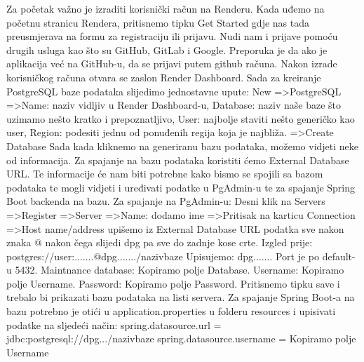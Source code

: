 			 \noindent Za početak važno je izraditi korisnički račun na Renderu. Kada uđemo na početnu stranicu Rendera, pritisnemo tipku Get Started gdje nas tada preusmjerava na formu za registraciju ili prijavu. Nudi nam i prijave pomoću drugih usluga kao što su GitHub, GitLab i Google. Preporuka je da ako je aplikacija već na GitHub-u, da se prijavi putem github računa.
			 \bigbreak
			 \noindent Nakon izrade korisničkog računa otvara se zaslon Render Dashboard. Sada za kreiranje PostgreSQL baze podataka slijedimo jednostavne upute:
			 \bigbreak
			\noindent  New =\textgreater  PostgreSQL =\textgreater  Name: naziv vidljiv u Render Dashboard-u, Database: naziv naše baze što uzimamo nešto kratko i prepoznatljivo, User: najbolje staviti nešto generičko kao user, Region: podesiti jednu od ponuđenih regija koja je najbliža. =\textgreater  Create Database
			\bigbreak
			\noindent Sada kada kliknemo na generiranu bazu podataka, možemo vidjeti neke od informacija. Za spajanje na bazu podataka koristiti ćemo External Database URL. 
			\bigbreak
			\noindent Te informacije će nam biti potrebne kako bismo se spojili sa bazom podataka te mogli vidjeti i uređivati podatke u PgAdmin-u te za spajanje Spring Boot backenda na bazu.
			\bigbreak
			\noindent Za spajanje na PgAdmin-u:
			Desni klik na Servers =\textgreater  Register =\textgreater  Server =\textgreater  Name: dodamo ime =\textgreater  Pritisak na karticu Connection =\textgreater  Host name/address upišemo iz External Database URL podatka sve nakon znaka @ nakon čega slijedi dpg pa sve do zadnje kose crte.\newline
			Izgled prije: postgres://user:.......@dpg......./nazivbaze \newline
			Upisujemo: dpg....... \newline
			Port je po default-u 5432. \newline
			Maintnance database: Kopiramo polje Database. \newline
			Username: Kopiramo polje Username. \newline
			Password: Kopiramo polje Password. \newline
			Pritisnemo tipku save i trebalo bi prikazati bazu podataka na listi servera.
			\bigbreak
			\noindent Za spajanje Spring Boot-a na bazu potrebno je otići u application.properties u folderu resources i upisivati podatke na sljedeći način:\newline
			spring.datasource.url = jdbc:postgresql://dpg.../nazivbaze \newline
			spring.datasource.username = Kopiramo polje Username \newline
